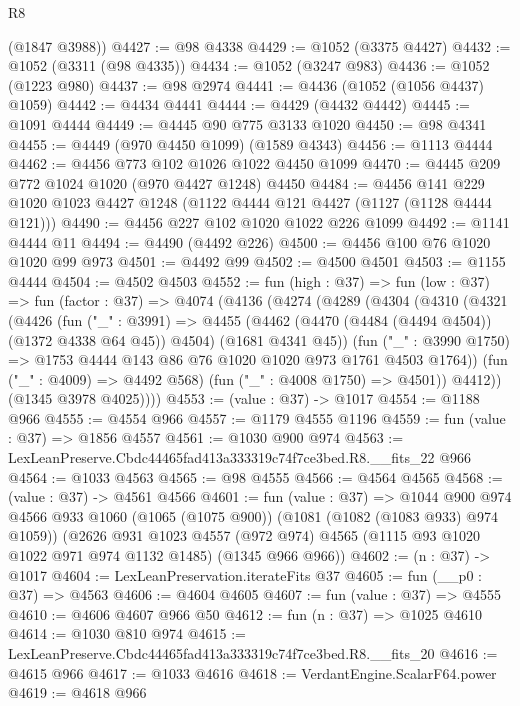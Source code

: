 \begin{lexlean}{R8}
\begin{coremodule}
      (@1847 @3988))
@4427 := @98 @4338
@4429 := @1052 (@3375 @4427)
@4432 := @1052 (@3311 (@98 @4335))
@4434 := @1052 (@3247 @983)
@4436 := @1052 (@1223 @980)
@4437 := @98 @2974
@4441 := @4436 (@1052 (@1056 @4437) @1059)
@4442 := @4434 @4441
@4444 := @4429 (@4432 @4442)
@4445 := @1091 @4444
@4449 := @4445 @90 @775 @3133 @1020
@4450 := @98 @4341
@4455 := @4449 (@970 @4450 @1099) (@1589 @4343)
@4456 := @1113 @4444
@4462 := @4456 @773 @102 @1026 @1022 @4450 @1099
@4470 := @4445 @209 @772 @1024 @1020 (@970 @4427 @1248) @4450
@4484 := @4456 @141 @229 @1020 @1023 @4427 @1248 (@1122 @4444 @121 @4427 (@1127 (@1128 @4444 @121)))
@4490 := @4456 @227 @102 @1020 @1022 @226 @1099
@4492 := @1141 @4444 @11
@4494 := @4490 (@4492 @226)
@4500 := @4456 @100 @76 @1020 @1020 @99 @973
@4501 := @4492 @99
@4502 := @4500 @4501
@4503 := @1155 @4444
@4504 := @4502 @4503
@4552 := fun (high : @37) =>
  fun (low : @37) =>
  fun (factor : @37) =>
  @4074
    (@4136
      (@4274
        (@4289
          (@4304
            (@4310
              (@4321
                (@4426
                  (fun ("_" : @3991) =>
                  @4455
                    (@4462 (@4470 (@4484 (@4494 @4504)) (@1372 @4338 @64 @45)) @4504)
                    (@1681 @4341 @45))
                  (fun ("_" : @3990 @1750) =>
                  @1753 @4444 @143 @86 @76 @1020 @1020 @973 @1761 @4503 @1764))
                (fun ("_" : @4009) => @4492 @568)
                (fun ("_" : @4008 @1750) => @4501))
              @4412))
          (@1345 @3978 @4025))))
@4553 := (value : @37) -> @1017
@4554 := @1188 @966
@4555 := @4554 @966
@4557 := @1179 @4555 @1196
@4559 := fun (value : @37) => @1856 @4557
@4561 := @1030 @900 @974
@4563 := LexLeanPreserve.Cbdc44465fad413a333319c74f7ce3bed.R8.__fits_22 @966
@4564 := @1033 @4563
@4565 := @98 @4555
@4566 := @4564 @4565
@4568 := (value : @37) -> @4561 @4566
@4601 := fun (value : @37) =>
  @1044
    @900
    @974
    @4566
    @933
    @1060
    (@1065 (@1075 @900))
    (@1081 (@1082 (@1083 @933) @974 @1059))
    (@2626
      @931
      @1023
      @4557
      (@972 @974)
      @4565
      (@1115 @93 @1020 @1022 @971 @974 @1132 @1485)
      (@1345 @966 @966))
@4602 := (n : @37) -> @1017
@4604 := LexLeanPreservation.iterateFits @37
@4605 := fun (__p0 : @37) => @4563
@4606 := @4604 @4605
@4607 := fun (value : @37) => @4555
@4610 := @4606 @4607 @966 @50
@4612 := fun (n : @37) => @1025 @4610
@4614 := @1030 @810 @974
@4615 := LexLeanPreserve.Cbdc44465fad413a333319c74f7ce3bed.R8.__fits_20
@4616 := @4615 @966
@4617 := @1033 @4616
@4618 := VerdantEngine.ScalarF64.power
@4619 := @4618 @966

\end{coremodule}
\end{lexlean}
